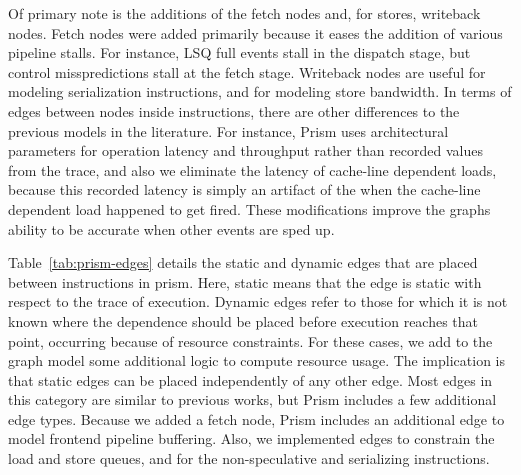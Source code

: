 Of primary note is the additions of the
fetch nodes and, for stores, writeback nodes.  Fetch nodes were added primarily
because it eases the addition of various pipeline stalls.  For instance, LSQ full events
stall in the dispatch stage, but control misspredictions stall at the fetch stage.
Writeback nodes are useful for modeling serialization instructions, and for modeling
store bandwidth.  In terms of edges between nodes inside instructions, there are other 
differences to the previous models in the literature.  For instance,
Prism uses architectural parameters for operation latency and throughput rather than recorded
values from the trace, and also we eliminate the latency of cache-line dependent loads, because this
recorded latency is simply an artifact of the when the cache-line dependent load happened
to get fired.  These modifications improve the graphs ability to be accurate when other events
are sped up.

Table~\ref{tab:prism-edges} details the static and dynamic edges that are placed
between instructions in prism.  Here, static means that the edge is static with
respect to the trace of execution.  Dynamic edges refer to those for which it 
is not known where the dependence should be placed before execution reaches
that point, occurring because of resource constraints.  For these cases, we add
to the graph model some additional logic to compute resource usage.
The implication is that static edges can be placed independently of any other
edge.  Most edges in this category are similar to previous works, but Prism
includes a few additional edge types.  Because we added a fetch node, Prism
includes an additional edge to model frontend pipeline buffering.  Also, we
implemented edges to constrain the load and store queues, and for the
non-speculative and serializing instructions.


